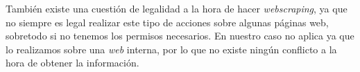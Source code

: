 También existe una cuestión de legalidad a la hora de hacer \emph{webscraping}, ya que no siempre es legal realizar este tipo de acciones sobre algunas páginas web, sobretodo si no tenemos los permisos necesarios. En nuestro caso no aplica ya que lo realizamos sobre una \emph{web} interna, por lo que no existe ningún conflicto a la hora de obtener la información.

